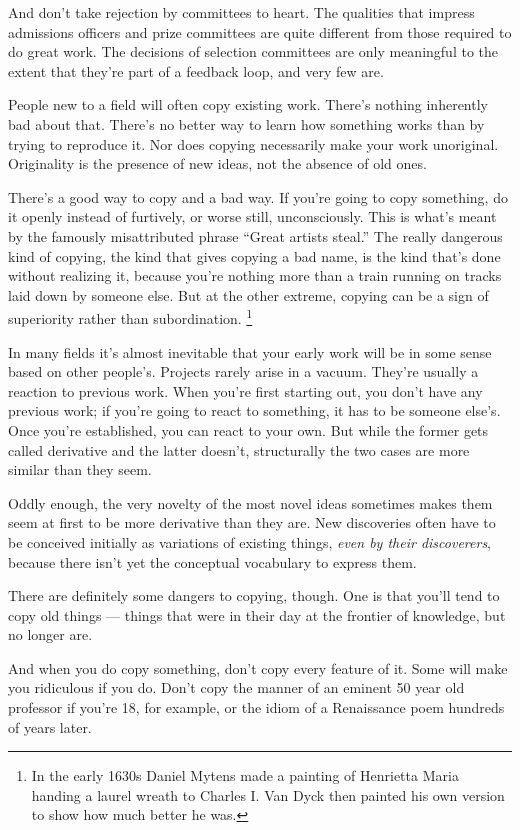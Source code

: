 And don't take rejection by committees to heart. The qualities that
impress admissions officers and prize committees are quite different
from those required to do great work. The decisions of selection
committees are only meaningful to the extent that they're part of a
feedback loop, and very few are.

People new to a field will often copy existing work. There's nothing
inherently bad about that. There's no better way to learn how something
works than by trying to reproduce it. Nor does copying necessarily make
your work unoriginal. Originality is the presence of new ideas, not the
absence of old ones.

There's a good way to copy and a bad way. If you're going to copy
something, do it openly instead of furtively, or worse still,
unconsciously. This is what's meant by the famously misattributed phrase
``Great artists steal.'' The really dangerous kind of copying, the kind
that gives copying a bad name, is the kind that's done without realizing
it, because you're nothing more than a train running on tracks laid down
by someone else. But at the other extreme, copying can be a sign of
superiority rather than subordination. \footnote{In the early 1630s Daniel Mytens made a painting of Henrietta
Maria handing a laurel wreath to Charles I. Van Dyck then painted his
own version to show how much better he was.}

In many fields it's almost inevitable that your early work will be in
some sense based on other people's. Projects rarely arise in a vacuum.
They're usually a reaction to previous work. When you're first starting
out, you don't have any previous work; if you're going to react to
something, it has to be someone else's. Once you're established, you can
react to your own. But while the former gets called derivative and the
latter doesn't, structurally the two cases are more similar than they
seem.

Oddly enough, the very novelty of the most novel ideas sometimes makes
them seem at first to be more derivative than they are. New discoveries
often have to be conceived initially as variations of existing things,
\emph{even by their discoverers}, because there isn't yet the conceptual
vocabulary to express them.

There are definitely some dangers to copying, though. One is that you'll
tend to copy old things --- things that were in their day at the
frontier of knowledge, but no longer are.

And when you do copy something, don't copy every feature of it. Some
will make you ridiculous if you do. Don't copy the manner of an eminent
50 year old professor if you're 18, for example, or the idiom of a
Renaissance poem hundreds of years later.

